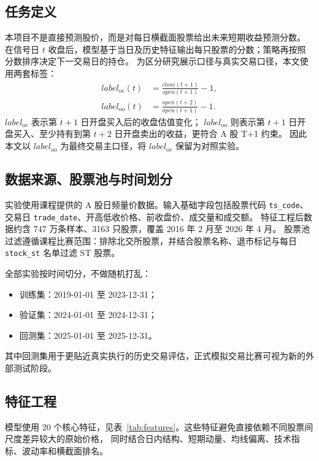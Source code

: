 \documentclass[UTF8,a4paper,11pt]{ctexart}
\begin{document}
\subsection{任务定义}

本项目不是直接预测股价，而是对每日横截面股票给出未来短期收益预测分数。
在信号日 $t$ 收盘后，模型基于当日及历史特征输出每只股票的分数；策略再按照分数排序决定下一交易日的持仓。
为区分研究展示口径与真实交易口径，本文使用两套标签：
\begin{align}
label_{\mathrm{oc}}(t) &= \frac{close(t+1)}{open(t+1)} - 1, \\
label_{\mathrm{oo}}(t) &= \frac{open(t+2)}{open(t+1)} - 1.
\end{align}
$label_{\mathrm{oc}}$ 表示第 $t+1$ 日开盘买入后的收盘估值变化；
$label_{\mathrm{oo}}$ 则表示第 $t+1$ 日开盘买入、至少持有到第 $t+2$ 日开盘卖出的收益，更符合 A 股 T+1 约束。
因此本文以 $label_{\mathrm{oo}}$ 为最终交易主口径，将 $label_{\mathrm{oc}}$ 保留为对照实验。

\subsection{数据来源、股票池与时间划分}

实验使用课程提供的 A 股日频量价数据。输入基础字段包括股票代码 \texttt{ts\_code}、交易日
\texttt{trade\_date}、开高低收价格、前收盘价、成交量和成交额。
特征工程后数据约含 747 万条样本、3163 只股票，覆盖 2016 年 2 月至 2026 年 4 月。
股票池过滤遵循课程比赛范围：排除北交所股票，并结合股票名称、退市标记与每日 \texttt{stock\_st} 名单过滤 ST 股票。

全部实验按时间切分，不做随机打乱：
\begin{itemize}
  \item 训练集：2019-01-01 至 2023-12-31；
  \item 验证集：2024-01-01 至 2024-12-31；
  \item 回测集：2025-01-01 至 2025-12-31。
\end{itemize}
其中回测集用于更贴近真实执行的历史交易评估，正式模拟交易比赛可视为新的外部测试阶段。

\subsection{特征工程}

模型使用 20 个核心特征，见表~\ref{tab:features}。这些特征避免直接依赖不同股票间尺度差异较大的原始价格，
同时结合日内结构、短期动量、均线偏离、技术指标、波动率和横截面排名。
\end{document}
